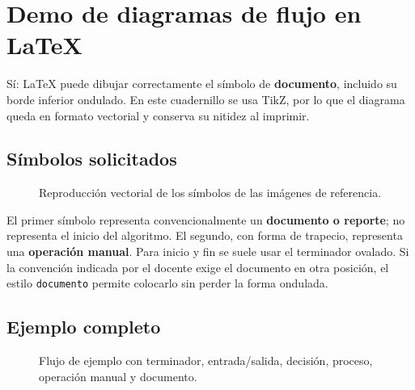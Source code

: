 \clearpage
\section{Demo de diagramas de flujo en LaTeX}

Sí: LaTeX puede dibujar correctamente el símbolo de \textbf{documento},
incluido su borde inferior ondulado. En este cuadernillo se usa TikZ, por lo
que el diagrama queda en formato vectorial y conserva su nitidez al imprimir.

\subsection{Símbolos solicitados}

\begin{figure}[H]
  \centering
  \caption{Reproducción vectorial de los símbolos de las imágenes de referencia.}
\end{figure}

El primer símbolo representa convencionalmente un \textbf{documento o
reporte}; no representa el inicio del algoritmo. El segundo, con forma de
trapecio, representa una \textbf{operación manual}. Para inicio y fin se suele
usar el terminador ovalado. Si la convención indicada por el docente exige el
documento en otra posición, el estilo \texttt{documento} permite colocarlo sin
perder la forma ondulada.

\clearpage
\vspace*{0pt}
\subsection{Ejemplo completo}

\begin{figure}[H]
  \centering
  \caption{Flujo de ejemplo con terminador, entrada/salida, decisión, proceso,
  operación manual y documento.}
\end{figure}

